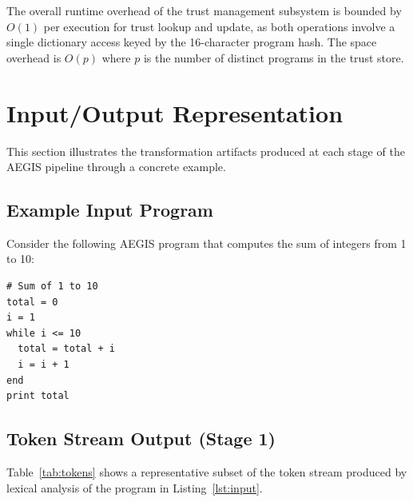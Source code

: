 \documentclass[conference]{IEEEtran}
\begin{document}
The overall runtime overhead of the trust management subsystem
is bounded by $O(1)$ per execution for trust lookup and update,
as both operations involve a single dictionary access keyed by
the 16-character program hash. The space overhead is $O(p)$
where $p$ is the number of distinct programs in the trust store.

\section{Input/Output Representation}
\label{sec:io}

This section illustrates the transformation artifacts produced
at each stage of the AEGIS pipeline through a concrete example.

\subsection{Example Input Program}

Consider the following AEGIS program that computes the sum of
integers from 1 to 10:

\begin{lstlisting}[caption={Example AEGIS input program},
                   label={lst:input}]
# Sum of 1 to 10
total = 0
i = 1
while i <= 10
  total = total + i
  i = i + 1
end
print total
\end{lstlisting}

\subsection{Token Stream Output (Stage 1)}

Table~\ref{tab:tokens} shows a representative subset of the
token stream produced by lexical analysis of the program in
Listing~\ref{lst:input}.
\end{document}
